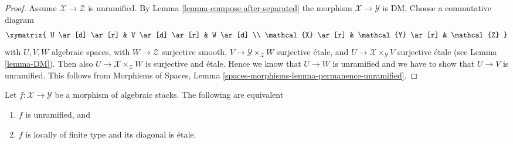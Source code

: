 \begin{proof}
Assume $\mathcal{X} \to \mathcal{Z}$ is unramified. By
Lemma \ref{lemma-compose-after-separated} the morphism
$\mathcal{X} \to \mathcal{Y}$ is DM. Choose a commutative diagram
$$
\xymatrix{
U \ar[d] \ar[r] & V \ar[d] \ar[r] & W \ar[d] \\
\mathcal{X} \ar[r] & \mathcal{Y} \ar[r] & \mathcal{Z}
}
$$
with $U, V, W$ algebraic spaces,
with $W \to \mathcal{Z}$ surjective smooth,
$V \to \mathcal{Y} \times_\mathcal{Z} W$ surjective \'etale, and
$U \to \mathcal{X} \times_\mathcal{Y} V$ surjective \'etale
(see Lemma \ref{lemma-DM}). Then also
$U \to \mathcal{X} \times_\mathcal{Z} W$ is surjective and \'etale.
Hence we know that $U \to W$ is unramified and we have to show that
$U \to V$ is unramified. This follows from
Morphisms of Spaces, Lemma \ref{spaces-morphisms-lemma-permanence-unramified}.
\end{proof}

\begin{lemma}
\label{lemma-characterize-unramified}
Let $f : \mathcal{X} \to \mathcal{Y}$ be a morphism of algebraic stacks.
The following are equivalent
\begin{enumerate}
\item $f$ is unramified, and
\item $f$ is locally of finite type and its diagonal is \'etale.
\end{enumerate}
\end{lemma}

